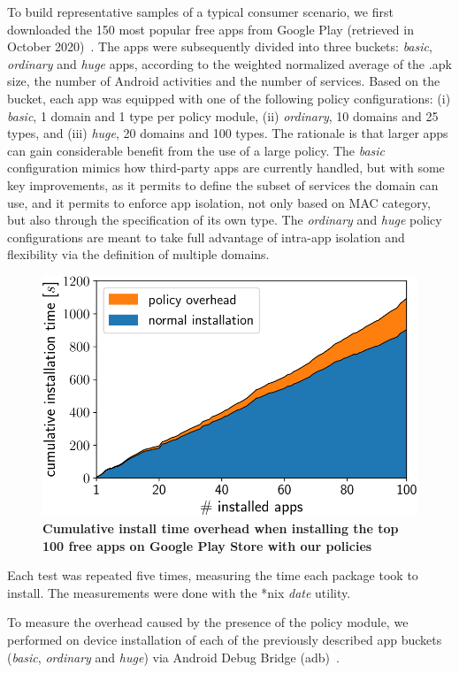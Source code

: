 To build representative samples of a typical consumer scenario, we
first downloaded the 150 most popular free apps from Google Play
(retrieved in October 2020)~\cite{seapp_topapps}.  The apps were
subsequently divided into three buckets: \emph{basic}, \emph{ordinary}
and \emph{huge} apps, according to the weighted normalized average of
the .apk size, the number of Android activities and the number of
services.  Based on the bucket, each app was equipped with one of the
following policy configurations: (i) \emph{basic}, 1 domain and 1 type
per policy module, (ii) \emph{ordinary}, 10 domains and 25 types, and
(iii) \emph{huge}, 20 domains and 100 types.  The rationale is that
larger apps can gain considerable benefit from the use of a large
policy.  The \emph{basic} configuration mimics how third-party apps
are currently handled, but with some key improvements, as it permits
to define the subset of services the domain can use, and it permits to
enforce app isolation, not only based on MAC category, but also
through the specification of its own type.  The \emph{ordinary} and
\emph{huge} policy configurations are meant to take full advantage of
intra-app isolation and flexibility via the definition of multiple
domains.
%
\begin{figure}[t]
	\centering
	\includegraphics[width=0.7\columnwidth]{chapters/seapp/data/top100_cumulative}
	\caption{\label{fig:seapp_benchmark100} \bf Cumulative install time
          overhead when installing the top 100 free apps on Google
          Play Store with our policies}
\end{figure}
%
Each test was repeated five times, measuring the time each package
took to install.  The measurements were done with the *nix {\em date}
utility.

To measure the overhead caused by the presence of the policy module,
we performed on device installation of each of the previously
described app buckets (\emph{basic}, \emph{ordinary} and \emph{huge})
via Android Debug Bridge (adb)~\cite{seapp_adblink}.

